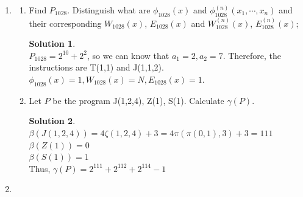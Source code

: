 \documentclass[12pt,a4paper]{article}
\theoremstyle{definition}
\newtheorem*{solution}{Solution}
\numberwithin{equation}{section}
\numberwithin{figure}{section}
\begin{document}
\begin{enumerate}
  \item
  \begin{enumerate}
    \item Find $P_{1028}$. Distinguish what are $\phi_{1028}(x)$ and $\phi_{1028}^{(n)}(x_1,\cdots,x_n)$ and their corresponding $W_{1028}(x)$, $E_{1028}(x)$ and $W^{(n)}_{1028}(x)$, $E^{(n)}_{1028}(x)$;
    \begin{solution}
    $ $\\
    $P_{1028} = 2^{10} + 2^2$, so we can know that $a_1 = 2, a_2 = 7$.
    Therefore, the instructions are T(1,1) and J(1,1,2).
    $\phi_{1028}(x) = 1, W_{1028}(x) = N, E_{1028}(x) = {1}.$
    \end{solution}
    \item Let $P$ be the program J(1,2,4), Z(1), S(1). Calculate $\gamma(P)$.
    \begin{solution} 
    $ $ \\
    $ \beta(J(1,2,4)) = 4\zeta(1,2,4) + 3 = 4\pi(\pi(0,1),3) + 3  = 111 $ \\
    $ \beta(Z(1)) = 0 $\\
    $ \beta(S(1)) = 1 $\\
    Thus, $\gamma(P) = 2^{111} + 2^{112} + 2^{114} - 1$
    \end{solution}
  \end{enumerate}
\item


\end{enumerate}
\end{document}
